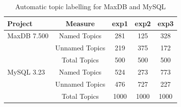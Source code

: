 \documentclass[smallextended]{svjour3}       %
\begin{document}
\begin{table}

	\centering
\begin{tabular}{l|c|c|c|c}
\toprule
\textbf{Project} & \textbf{Measure} & \textsf{exp1} & \textsf{exp2} & \textsf{exp3} \\
\midrule



MaxDB 7.500 & Named Topics   & 281 & 125 & 328 \\ %
 & Unnamed Topics & 219  & 375 &  172  \\
 & Total  Topics  & 500 & 500 & 500 \\
\midrule
MySQL 3.23  & Named Topics   & 524 & 273 & 773 \\
  & Unnamed Topics & 476 & 727 & 227 \\
  & Total  Topics  & 1000 & 1000 & 1000 \\


\bottomrule
\end{tabular}
	\caption{Automatic topic labelling for MaxDB and MySQL}%
	\label{tbl:wordlist}

\end{table}
\end{document}
